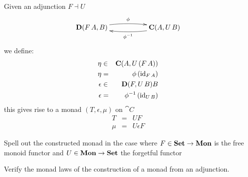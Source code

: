 \documentclass[handout]{beamer}
\begin{document}
\begin{frame}
  Given an adjunction $F \dashv U$
  \[\xymatrix{
    \hom{D}{F\,A}{B} \ar@/^/[rr]^\phi
    &&  \hom{C}{A}{U\,B}  \ar@/^/[ll]^{\phi^{-1}}
  }\]
  we define:
  \begin{eqnarray*}
    \eta & \in & \mathbf{C}(A,U\,(F\,A))\\
    \eta & = & \phi\,(\mathrm{id}_{F\,A})\\
    \epsilon & \in & \mathbf{D}(F,U\,B){B}\\
    \epsilon & = & \phi^{-1}\,(\mathrm{id}_{U\,B})
  \end{eqnarray*}
  this gives rise to a monad $(T,\epsilon,\mu)$ on $\cat{C}$ 
  \begin{eqnarray*}
    T & = & U F \\
    \mu & = & U \epsilon F
  \end{eqnarray*}

\end{frame}

\begin{frame}
  \begin{exercise}
    Spell out the constructed monad in the case where
    $F\in\mathbf{Set}\to\mathbf{Mon}$ is the free monoid functor and
    $U\in\mathbf{Mon}\to\mathbf{Set}$ the forgetful functor
  \end{exercise}

  \begin{exercise}
    Verify the monad laws of the construction of a monad from an adjunction.
  \end{exercise}

\end{frame}
\end{document}
